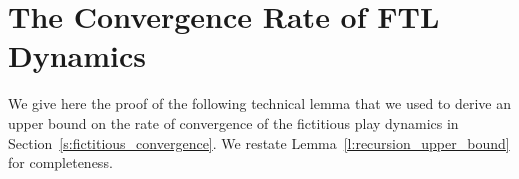 \section{The Convergence Rate of FTL Dynamics}\label{app:s:fictitious_convergence}
We give here the proof of the following technical lemma that we used to derive
an upper bound on the rate of convergence of the fictitious play dynamics in
Section~\ref{s:fictitious_convergence}.  We restate Lemma~\ref{l:recursion_upper_bound} for
completeness.
